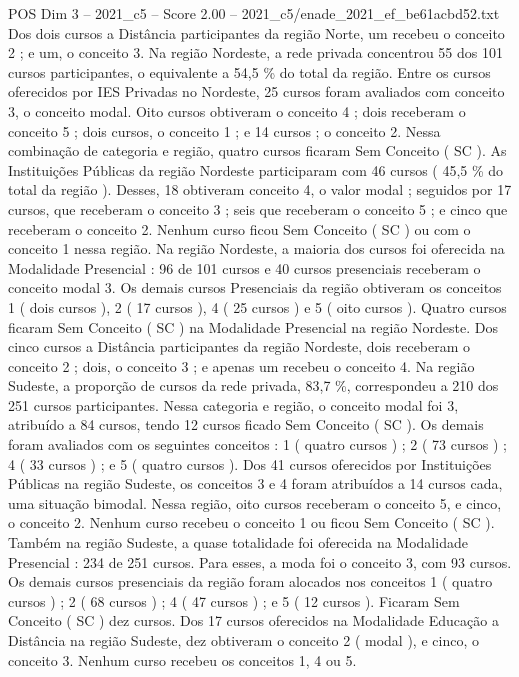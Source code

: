 \begin{textsample}{POS Dim 3 – 2021\_c5 – Score 2.00 – 2021\_c5/enade\_2021\_ef\_be61acbd52.txt}
Dos dois cursos a Distância participantes da região Norte, um recebeu o conceito 2 ; e um, o conceito 3.
Na região Nordeste, a rede privada concentrou 55 dos 101 cursos participantes, o equivalente a 54,5 \% do total da região.
Entre os cursos oferecidos por IES Privadas no Nordeste, 25 cursos foram avaliados com conceito 3, o conceito modal.
Oito cursos obtiveram o conceito 4 ; dois receberam o conceito 5 ; dois cursos, o conceito 1 ; e 14 cursos ; o conceito 2.
Nessa combinação de categoria e região, quatro cursos ficaram Sem Conceito ( SC ).
As Instituições Públicas da região Nordeste participaram com 46 cursos ( 45,5 \% do total da região ).
Desses, 18 obtiveram conceito 4, o valor modal ; seguidos por 17 cursos, que receberam o conceito 3 ; seis que receberam o conceito 5 ; e cinco que receberam o conceito 2.
Nenhum curso ficou Sem Conceito ( SC ) ou com o conceito 1 nessa região.
Na região Nordeste, a maioria dos cursos foi oferecida na Modalidade Presencial : 96 de 101 cursos e 40 cursos presenciais receberam o conceito modal 3.
Os demais cursos Presenciais da região obtiveram os conceitos 1 ( dois cursos ), 2 ( 17 cursos ), 4 ( 25 cursos ) e 5 ( oito cursos ).
Quatro cursos ficaram Sem Conceito ( SC ) na Modalidade Presencial na região Nordeste.
Dos cinco cursos a Distância participantes da região Nordeste, dois receberam o conceito 2 ; dois, o conceito 3 ; e apenas um recebeu o conceito 4.
Na região Sudeste, a proporção de cursos da rede privada, 83,7 \%, correspondeu a 210 dos 251 cursos participantes.
Nessa categoria e região, o conceito modal foi 3, atribuído a 84 cursos, tendo 12 cursos ficado Sem Conceito ( SC ).
Os demais foram avaliados com os seguintes conceitos : 1 ( quatro cursos ) ; 2 ( 73 cursos ) ; 4 ( 33 cursos ) ; e 5 ( quatro cursos ).
Dos 41 cursos oferecidos por Instituições Públicas na região Sudeste, os conceitos 3 e 4 foram atribuídos a 14 cursos cada, uma situação bimodal.
Nessa região, oito cursos receberam o conceito 5, e cinco, o conceito 2.
Nenhum curso recebeu o conceito 1 ou ficou Sem Conceito ( SC ).
Também na região Sudeste, a quase totalidade foi oferecida na Modalidade Presencial : 234 de 251 cursos.
Para esses, a moda foi o conceito 3, com 93 cursos.
Os demais cursos presenciais da região foram alocados nos conceitos 1 ( quatro cursos ) ; 2 ( 68 cursos ) ; 4 ( 47 cursos ) ; e 5 ( 12 cursos ).
Ficaram Sem Conceito ( SC ) dez cursos.
Dos 17 cursos oferecidos na Modalidade Educação a Distância na região Sudeste, dez obtiveram o conceito 2 ( modal ), e cinco, o conceito 3.
Nenhum curso recebeu os conceitos 1, 4 ou 5.

\end{textsample}
